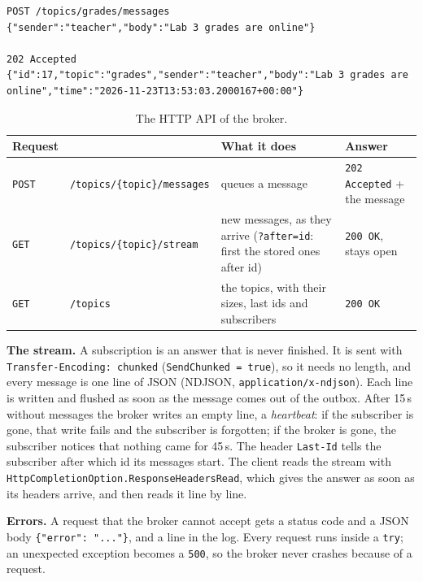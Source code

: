 \documentclass[11pt,a4paper]{article}
\newcommand{\code}[1]{{\frenchspacing\texttt{#1}}}
\begin{document}
\begin{lstlisting}
POST /topics/grades/messages
{"sender":"teacher","body":"Lab 3 grades are online"}

202 Accepted
{"id":17,"topic":"grades","sender":"teacher","body":"Lab 3 grades are online","time":"2026-11-23T13:53:03.2000167+00:00"}
\end{lstlisting}

\begin{table}[H]
\centering\small
\caption{The HTTP API of the broker.}\label{tab:api}
\begin{tabularx}{\linewidth}{@{}llXl@{}}
\toprule
Request & & What it does & Answer \\
\midrule
\code{POST} & \code{/topics/\{topic\}/messages} & queues a message & \code{202 Accepted} + the message \\
\code{GET} & \code{/topics/\{topic\}/stream} & new messages, as they arrive (\code{?after=id}: first the stored ones after id) & \code{200 OK}, stays open \\
\code{GET} & \code{/topics} & the topics, with their sizes, last ids and subscribers & \code{200 OK} \\
\bottomrule
\end{tabularx}
\end{table}

\textbf{The stream.} A subscription is an answer that is never finished. It is sent with
\code{Transfer-Encoding: chunked} (\code{SendChunked = true}), so it needs no length, and every
message is one line of JSON (NDJSON, \code{application/x-ndjson}). Each line is written and flushed
as soon as the message comes out of the outbox. After 15\,s without messages the broker writes an
empty line, a \emph{heartbeat}: if the subscriber is gone, that write fails and the subscriber is
forgotten; if the broker is gone, the subscriber notices that nothing came for 45\,s. The header
\code{Last-Id} tells the subscriber after which id its messages start. The client reads the stream
with \code{HttpCompletionOption.ResponseHeadersRead}, which gives the answer as soon as its headers
arrive, and then reads it line by line.

\textbf{Errors.} A request that the broker cannot accept gets a status code and a JSON body
\code{\{"error": "..."\}}, and a line in the log. Every request runs inside a \code{try}; an
unexpected exception becomes a \code{500}, so the broker never crashes because of a request.
\end{document}
